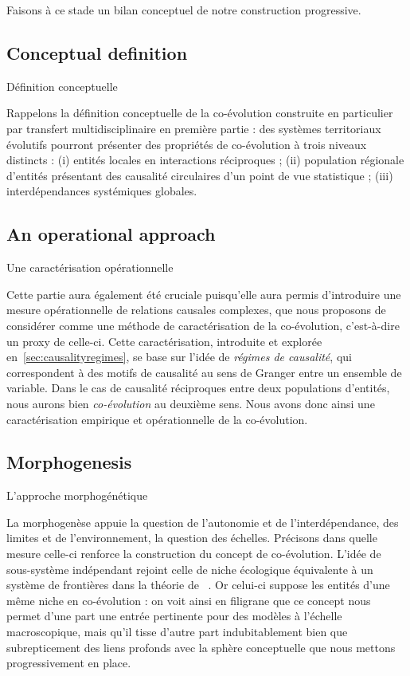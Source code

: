 Faisons à ce stade un bilan conceptuel de notre construction progressive.


\subsection*{Conceptual definition}{Définition conceptuelle}


Rappelons la définition conceptuelle de la co-évolution construite en particulier par transfert multidisciplinaire en première partie : des systèmes territoriaux évolutifs pourront présenter des propriétés de co-évolution à trois niveaux distincts : (i) entités locales en interactions réciproques ; (ii) population régionale d'entités présentant des causalité circulaires d'un point de vue statistique ; (iii) interdépendances systémiques globales.


\subsection*{An operational approach}{Une caractérisation opérationnelle}


Cette partie aura également été cruciale puisqu'elle aura permis d'introduire une mesure opérationnelle de relations causales complexes, que nous proposons de considérer comme une méthode de caractérisation de la co-évolution, c'est-à-dire un proxy de celle-ci. Cette caractérisation, introduite et explorée en~\ref{sec:causalityregimes}, se base sur l'idée de \emph{régimes de causalité}, qui correspondent à des motifs de causalité au sens de Granger entre un ensemble de variable. Dans le cas de causalité réciproques entre deux populations d'entités, nous aurons bien \emph{co-évolution} au deuxième sens. Nous avons donc ainsi une caractérisation empirique et opérationnelle de la co-évolution.



\subsection*{Morphogenesis}{L'approche morphogénétique}


La morphogenèse appuie la question de l'autonomie et de l'interdépendance, des limites et de l'environnement, la question des échelles. Précisons dans quelle mesure celle-ci renforce la construction du concept de co-évolution. L'idée de sous-système indépendant rejoint celle de niche écologique équivalente à un système de frontières dans la théorie de ~\cite{holland2012signals}. Or celui-ci suppose les entités d'une même niche en co-évolution : on voit ainsi en filigrane que ce concept nous permet d'une part une entrée pertinente pour des modèles à l'échelle macroscopique, mais qu'il tisse d'autre part indubitablement bien que subrepticement des liens profonds avec la sphère conceptuelle que nous mettons progressivement en place.




